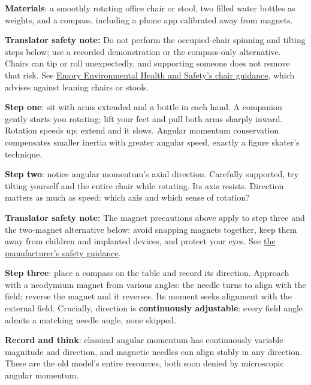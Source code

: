 \begin{experiment}
\textbf{Materials}: a smoothly rotating office chair or stool, two filled water bottles as weights, and a compass, including a phone app calibrated away from magnets.

\textbf{Translator safety note:} Do not perform the occupied-chair spinning and tilting steps below; use a recorded demonstration or the compass-only alternative. Chairs can tip or roll unexpectedly, and supporting someone does not remove that risk. See \href{https://ehso.emory.edu/sso/documents/toolbox-training_reducing-chair-related-injuries.pdf}{Emory Environmental Health and Safety's chair guidance}, which advises against leaning chairs or stools.

\textbf{Step one}: sit with arms extended and a bottle in each hand. A companion gently starts you rotating; lift your feet and pull both arms sharply inward. Rotation speeds up; extend and it slows. Angular momentum conservation compensates smaller inertia with greater angular speed, exactly a figure skater's technique.

\textbf{Step two}: notice angular momentum's axial direction. Carefully supported, try tilting yourself and the entire chair while rotating. Its axis resists. Direction matters as much as speed: which axis and which sense of rotation?

\textbf{Translator safety note:} The magnet precautions above apply to step three and the two-magnet alternative below: avoid snapping magnets together, keep them away from children and implanted devices, and protect your eyes. See \href{https://www.kjmagnetics.com/neodymium-magnet-safety.asp}{the manufacturer's safety guidance}.

\textbf{Step three}: place a compass on the table and record its direction. Approach with a neodymium magnet from various angles: the needle turns to align with the field; reverse the magnet and it reverses. Its moment seeks alignment with the external field. Crucially, direction is \textbf{continuously adjustable}: every field angle admits a matching needle angle, none skipped.

\textbf{Record and think}: classical angular momentum has continuously variable magnitude and direction, and magnetic needles can align stably in any direction. These are the old model's entire resources, both soon denied by microscopic angular momentum.
\end{experiment}

